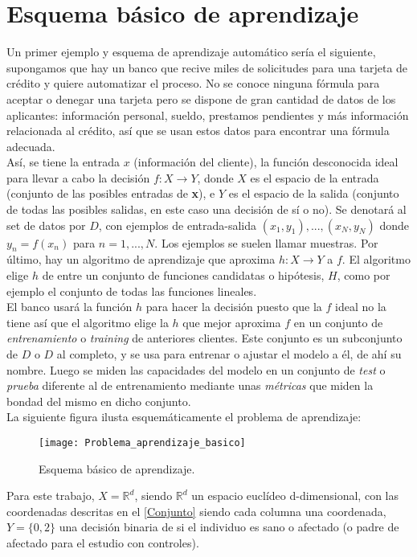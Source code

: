 \section{Esquema básico de aprendizaje}\label{st:basic}
Un primer ejemplo y esquema de aprendizaje automático sería el siguiente, supongamos que hay un banco que recive miles de solicitudes para una tarjeta de crédito y quiere automatizar el proceso. No se conoce ninguna fórmula para aceptar o denegar una tarjeta pero se dispone de gran cantidad de datos de los aplicantes: información personal, sueldo, prestamos pendientes y más información relacionada al crédito, así que se usan estos datos para encontrar una fórmula adecuada.\\
Así, se tiene la entrada \textbf{$x$} (información del cliente), la función desconocida ideal para llevar a cabo la decisión $f:X \rightarrow Y$, donde $X$ es el espacio de la entrada (conjunto de las posibles entradas de \textbf{x}), e $Y$ es el espacio de la salida (conjunto de todas las posibles salidas, en este caso una decisión de sí o no). Se denotará al set de datos por $D$, con ejemplos de entrada-salida $(x_{1},y_{1}),...,(x_{N},y_{N})$ donde $y_{n}=f(x_{n})$ para $n=1,...,N$. Los ejemplos se suelen llamar muestras. Por último, hay un algoritmo de aprendizaje que aproxima $h:X \rightarrow Y$ a $f$.  El algoritmo elige $h$ de entre un conjunto de funciones candidatas o hipótesis, $H$, como por ejemplo el conjunto de todas las funciones lineales.\\
El banco usará la función $h$ para hacer la decisión puesto que la $f$ ideal no la tiene así que el algoritmo elige la $h$ que mejor aproxima $f$ en un conjunto de \textit{entrenamiento} o \textit{training} de anteriores clientes. \cite{abu2012learning} Este conjunto es un subconjunto de $D$ o $D$ al completo, y se usa para entrenar o ajustar el modelo a él, de ahí su nombre. Luego se miden las capacidades del modelo en un conjunto de \textit{test} o \textit{prueba} diferente al de entrenamiento mediante unas \textit{métricas} que miden la bondad del mismo en dicho conjunto.\\
La siguiente figura ilusta esquemáticamente el problema de aprendizaje:
\begin{figure}[H]
  \centering
  \texttt{[image: Problema\_aprendizaje\_basico]}
  \caption{Esquema básico de aprendizaje. \cite{abu2012learning}}
  \label{fig:k-nn-example}
\end{figure}

Para este trabajo, $X=\mathbb{R}^{d}$, siendo $\mathbb{R}^{d}$ un espacio euclídeo d-dimensional, con las coordenadas descritas en el \autoref{Conjunto} siendo cada columna una coordenada, $Y=\lbrace 0,2 \rbrace$ una decisión binaria de si el individuo es sano o afectado (o padre de afectado para el estudio con controles).\\

